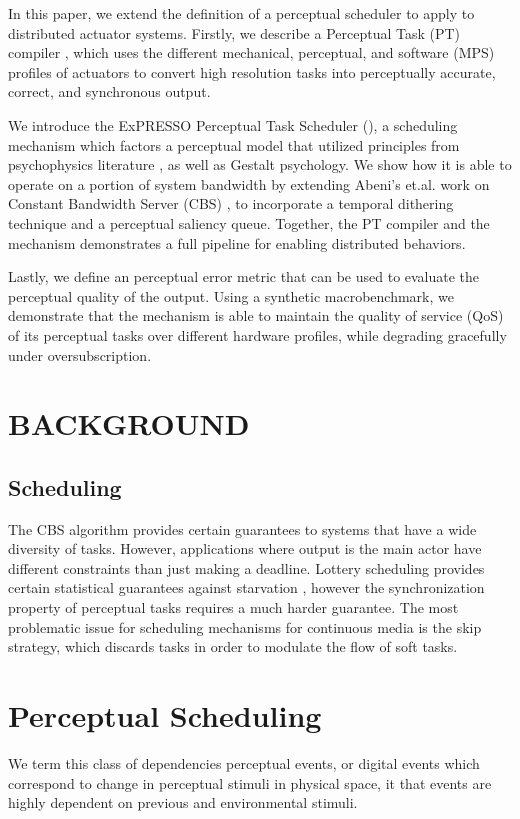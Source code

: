 \documentclass{sigchi}
\newcommand{\expresso}{ExPRESSO }
\newcommand*{\schedule}[1]{{\textbf{\small{\fontfamily{cmss}\selectfont{#1}}}}}
\begin{document}
In this paper, we extend the definition of a perceptual scheduler \cite{chaudhary_perceptual_2001} to apply to distributed actuator systems. Firstly, we describe a Perceptual Task (PT) compiler , which uses the different mechanical, perceptual, and software (MPS) profiles of actuators to convert high resolution tasks into perceptually accurate, correct, and synchronous output. 

We introduce the \expresso Perceptual Task Scheduler (\schedule{PTS}), a scheduling mechanism which factors a perceptual model that utilized principles from psychophysics literature \cite{pelli_psychophysical_1995}, as well as Gestalt psychology. We show how it is able to operate on a portion of system bandwidth by extending Abeni's et.al. work on Constant Bandwidth Server (CBS) \cite{abeni_integrating_1998}, to incorporate a temporal dithering technique and a perceptual saliency queue. Together, the PT compiler and the \schedule{PTS} mechanism demonstrates a full pipeline for enabling distributed behaviors. 

Lastly, we define an perceptual error metric that can be used to evaluate the perceptual quality of the output. Using a synthetic macrobenchmark, we demonstrate that the \schedule{PTS} mechanism is able to maintain the quality of service (QoS) of its perceptual tasks over different hardware profiles, while degrading gracefully under oversubscription. 

\section{BACKGROUND}

  \subsection{Scheduling}
  The CBS algorithm \cite{abeni_integrating_1998} provides certain guarantees to systems that have a wide diversity of tasks. However, applications where output is the main actor have different constraints than just making a deadline.  Lottery scheduling provides certain statistical guarantees against starvation \cite{waldspurger_lottery_1994}, however the synchronization property of perceptual tasks requires a much harder guarantee. The most problematic issue for scheduling mechanisms for continuous media is the skip strategy, which discards tasks in order to modulate the flow of soft tasks. 

\section{Perceptual Scheduling}
  We term this class of dependencies perceptual events, or digital events which correspond to change in perceptual stimuli in physical space, it that events are highly dependent on previous and environmental stimuli. 
\end{document}
